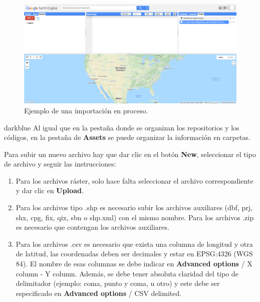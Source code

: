 \documentclass[
  12pt,
  letterpaper,
  twoside]{book}
\providecommand{\tightlist}{%
  \setlength{\itemsep}{0pt}\setlength{\parskip}{0pt}}
\begin{document}
\begin{figure}[H]

{\centering \includegraphics[width=0.95\linewidth]{Img/Asset3} 

}

\caption{Ejemplo de una importación en proceso.}\label{fig:f44}
\end{figure}

\begin{bluebox2}

\begin{awesomeblock}{5pt}{\faLightbulb}{darkblue}
Al igual que en la pestaña donde se organizan los repositorios y los códigos, en la pestaña de \textbf{Assets} se puede organizar la información en carpetas.

\end{awesomeblock}

\end{bluebox2}

Para subir un nuevo archivo hay que dar clic en el botón \textbf{New}, seleccionar el tipo de archivo y seguir las instrucciones:

\begin{enumerate}
\def\labelenumi{\arabic{enumi}.}
\tightlist
\item
  Para los archivos ráster, solo hace falta seleccionar el archivo correspondiente y dar clic en \textbf{Upload}.
\item
  Para los archivos tipo .shp es necesario subir los archivos auxiliares (dbf, prj, shx, cpg, fix, qix, sbn o shp.xml) con el mismo nombre. Para los archivos .zip es necesario que contengan los archivos auxiliares.
\item
  Para los archivos .csv es necesario que exista una columna de longitud y otra de latitud, las coordenadas deben ser decimales y estar en EPSG:4326 (WGS 84). El nombre de esas columnas se debe indicar en \textbf{Advanced options} / X column - Y column. Además, se debe tener absoluta claridad del tipo de delimitador (ejemplo: coma, punto y coma, u otro) y este debe ser especificado en \textbf{Advanced options} / CSV delimited.
\end{enumerate}
\end{document}
